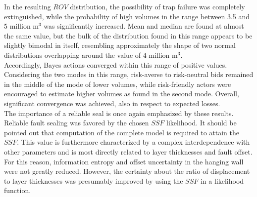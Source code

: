 		In the resulting $ROV$ distribution, the possibility of trap failure was completely extinguished, while the probability of high volumes in the range between 3.5  and 5 million m$^3$ was significantly increased. Mean and median are found at almost the same value, but the bulk of the distribution found in this range appears to be slightly bimodal in itself, resembling approximately the shape of two normal distributions overlapping around the value of 4 million m$^3$.\\
		Accordingly, Bayes actions converged within this range of positive values. Considering the two modes in this range, risk-averse to risk-neutral bids remained in the middle of the mode of lower volumes, while risk-friendly actors were encouraged to estimate higher volumes as found in the second mode. Overall, significant convergence was achieved, also in respect to expected losses.\\		
		The importance of a reliable seal is once again emphasized by these results. Reliable fault sealing was favored by the chosen $SSF$ likelihood. It should be pointed out that computation of the complete model is required to attain the $SSF$. This value is furthermore characterized by a complex interdependence with other parameters and is most directly related to layer thicknesses and fault offset. For this reason, information entropy and offset uncertainty in the hanging wall were not greatly reduced. However, the certainty about the ratio of displacement to layer thicknesses was presumably improved by using the $SSF$ in a likelihood function.
		
